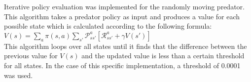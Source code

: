 Iterative policy evaluation was implemented for the randomly moving predator. This algorithm takes a predator policy as input and produces a value for each possible state which is calculated according to the following formula: \\

\begin{math}
  V(s) = \sum_a \pi (s, a) \sum_{s'} \mathcal{P}_{ss'}^a \left[\mathcal{R}_{ss'}^a + \gamma V(s') \right]
\end{math} \\

This algorithm loops over all states until it finds that the difference between the previous value for $V(s)$ and the updated value is less than a certain threshold for all states. In the case of this specific implementation, a threshold of 0.0001 was used.
